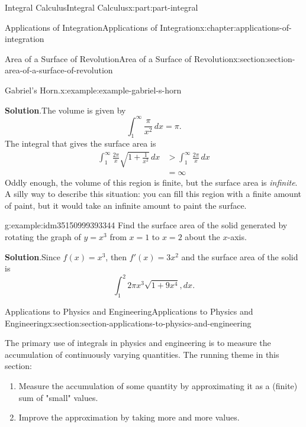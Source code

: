 \documentclass[twoside,10pt,]{tufte-book}
\newcommand{\blocktitlefont}{\relax}
\numberwithin{equation}{part}
\newcommand{\gt}{>}
\newcommand{\amp}{&}
\begin{document}
\begin{partptx}{Integral Calculus}{}{Integral Calculus}{}{}{x:part:part-integral}
\begin{chapterptx}{Applications of Integration}{}{Applications of Integration}{}{}{x:chapter:applications-of-integration}
\begin{sectionptx}{Area of a Surface of Revolution}{}{Area of a Surface of Revolution}{}{}{x:section:section-area-of-a-surface-of-revolution}
\begin{example}{Gabriel's Horn.}{x:example:example-gabriel-s-horn}
\par\smallskip%
\noindent\textbf{\blocktitlefont Solution}.\hypertarget{g:solution:idm35150999395392}{}\quad{}The volume is given by%
\begin{equation*}
\int_{1}^{\infty}\frac{\pi}{x^{2}}\,dx = \pi\text{.}
\end{equation*}
The integral that gives the surface area is%
%
\begin{align*}
\int_{1}^{\infty}\frac{2\pi}{x}\sqrt{1 + \frac{1}{x^{2}}}\,dx \amp \gt \int_{1}^{\infty}\frac{2\pi}{x}\,dx \\
\amp = \infty 
\end{align*}
Oddly enough, the volume of this region is finite, but the surface area is \emph{infinite}. A silly way to describe this situation: you can fill this region with a finite amount of paint, but it would take an infinite amount to paint the surface.%
\end{example}
\begin{example}{}{g:example:idm35150999393344}%
Find the surface area of the solid generated by rotating the graph of \(y=x^{3}\) from \(x=1\) to \(x=2\) about the \(x\)-axis.%
\par\smallskip%
\noindent\textbf{\blocktitlefont Solution}.\hypertarget{g:solution:idm35150999391296}{}\quad{}Since \(f(x)=x^{3}\), then \(f'(x)=3x^{2}\) and the surface area of the solid is%
\begin{equation*}
\int_{1}^{2}2\pi x^{3}\sqrt{1+9x^{4}},dx.
\end{equation*}
%
\end{example}
\end{sectionptx}
%
%
\typeout{************************************************}
\typeout{************************************************}
%
\begin{sectionptx}{Applications to Physics and Engineering}{}{Applications to Physics and Engineering}{}{}{x:section:section-applications-to-physics-and-engineering}
\begin{introduction}{}%
The primary use of integrals in physics and engineering is to measure the accumulation of continuously varying quantities. The running theme in this section:%
%
\begin{enumerate}
\item{}Measure the accumulation of some quantity by approximating it as a (finite) sum of "small" values.%
\item{}Improve the approximation by taking more and more values.%

\end{enumerate}
\end{introduction}
\end{sectionptx}
\end{chapterptx}
\end{partptx}
\end{document}
